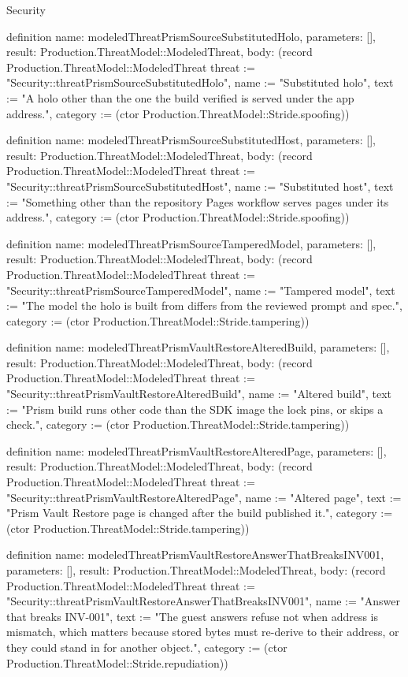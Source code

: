 \begin{lexlean}{Security}
\begin{semanticmodule}
definition{
  name: modeledThreatPrismSourceSubstitutedHolo,
  parameters: [],
  result: Production.ThreatModel::ModeledThreat,
  body: (record Production.ThreatModel::ModeledThreat {threat := "Security::threatPrismSourceSubstitutedHolo", name := "Substituted holo", text := "A holo other than the one the build verified is served under the app address.", category := (ctor Production.ThreatModel::Stride.spoofing)})
}

definition{
  name: modeledThreatPrismSourceSubstitutedHost,
  parameters: [],
  result: Production.ThreatModel::ModeledThreat,
  body: (record Production.ThreatModel::ModeledThreat {threat := "Security::threatPrismSourceSubstitutedHost", name := "Substituted host", text := "Something other than the repository Pages workflow serves pages under its address.", category := (ctor Production.ThreatModel::Stride.spoofing)})
}

definition{
  name: modeledThreatPrismSourceTamperedModel,
  parameters: [],
  result: Production.ThreatModel::ModeledThreat,
  body: (record Production.ThreatModel::ModeledThreat {threat := "Security::threatPrismSourceTamperedModel", name := "Tampered model", text := "The model the holo is built from differs from the reviewed prompt and spec.", category := (ctor Production.ThreatModel::Stride.tampering)})
}

definition{
  name: modeledThreatPrismVaultRestoreAlteredBuild,
  parameters: [],
  result: Production.ThreatModel::ModeledThreat,
  body: (record Production.ThreatModel::ModeledThreat {threat := "Security::threatPrismVaultRestoreAlteredBuild", name := "Altered build", text := "Prism build runs other code than the SDK image the lock pins, or skips a check.", category := (ctor Production.ThreatModel::Stride.tampering)})
}

definition{
  name: modeledThreatPrismVaultRestoreAlteredPage,
  parameters: [],
  result: Production.ThreatModel::ModeledThreat,
  body: (record Production.ThreatModel::ModeledThreat {threat := "Security::threatPrismVaultRestoreAlteredPage", name := "Altered page", text := "Prism Vault Restore page is changed after the build published it.", category := (ctor Production.ThreatModel::Stride.tampering)})
}

definition{
  name: modeledThreatPrismVaultRestoreAnswerThatBreaksINV001,
  parameters: [],
  result: Production.ThreatModel::ModeledThreat,
  body: (record Production.ThreatModel::ModeledThreat {threat := "Security::threatPrismVaultRestoreAnswerThatBreaksINV001", name := "Answer that breaks INV-001", text := "The guest answers refuse not when address is mismatch, which matters because stored bytes must re-derive to their address, or they could stand in for another object.", category := (ctor Production.ThreatModel::Stride.repudiation)})
}


\end{semanticmodule}
\end{lexlean}
